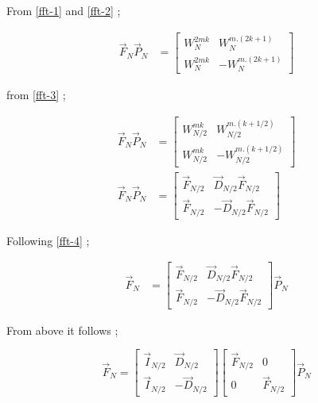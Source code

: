 \documentclass[journal,12pt,twocolumn]{IEEEtran}
\renewcommand\thesection{\arabic{section}}
\begin{document}
\begin{enumerate}[label=\arabic*.,ref=\thesection.\theenumi]
From \eqref{fft-1} and \eqref{fft-2} ;

\begin{align}
	\vec{F}_{N}\vec{P}_{N}&=\begin{bmatrix}
		{W_{N}^{2mk}}&{W_{N}^{m.(2k+1)}}\\ {W_{N}^{2mk}}&-{W_{N}^{m.(2k+1)}}
	\end{bmatrix}  	
\end{align}
 
from \eqref{fft-3} ;

\begin{align}
	\vec{F}_{N}\vec{P}_{N}&=\begin{bmatrix}
		{W_{N/2}^{mk}}&{W_{N/2}^{m.(k+1/2)}}\\ {W_{N/2}^{mk}}&-{W_{N/2}^{m.(k+1/2)}}
	\end{bmatrix} 	\\
	\vec{F}_{N}\vec{P}_{N}&=\begin{bmatrix}
		\vec{F}_{N/2}&\vec{D}_{N/2}\vec{F}_{N/2}\\ \vec{F}_{N/2}&-\vec{D}_{N/2}\vec{F}_{N/2}
	\end{bmatrix}    	
\end{align}

Following \eqref{fft-4} ;

\begin{align}
	\vec{F}_{N}&=\begin{bmatrix}
		\vec{F}_{N/2}&\vec{D}_{N/2}\vec{F}_{N/2}\\ \vec{F}_{N/2}&-\vec{D}_{N/2}\vec{F}_{N/2}
	\end{bmatrix} \vec{P}_{N}   	
\end{align}

From above it follows ;

\begin{equation}
	\vec{F}_{N}=
	\begin{bmatrix}
		\vec{I}_{N/2} & \vec{D}_{N/2} \\
		\vec{I}_{N/2} & -\vec{D}_{N/2}
	\end{bmatrix}
	\begin{bmatrix}
		\vec{F}_{N/2} & 0 \\
		0 & \vec{F}_{N/2}
	\end{bmatrix}
	\vec{P}_{N}
\end{equation}


\end{enumerate}
\end{document}
